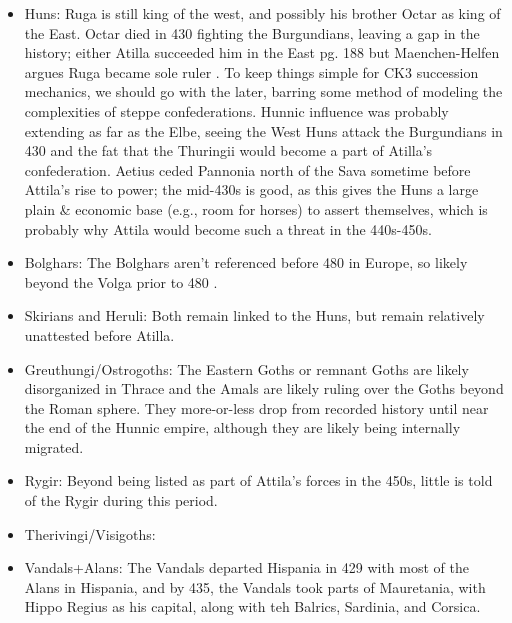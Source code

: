 \documentclass{article}
\begin{document}
	\begin{itemize}
		\item Huns:\newline
		Ruga is still king of the west, and possibly his brother Octar as king of the East.
		Octar died in 430 fighting the Burgundians, leaving a gap in the history; either Atilla succeeded him in the East \cite{CambridgeHistoryEarlyInnerAsia} \tiny pg. 188 \normalsize but Maenchen-Helfen argues Ruga became sole ruler \cite{OttoHuns}.
		To keep things simple for CK3 succession mechanics, we should go with the later, barring some method of modeling the complexities of steppe confederations.
		Hunnic influence was probably extending as far as the Elbe, seeing the West Huns attack the Burgundians in 430 and the fat that the Thuringii would become a part of Atilla's confederation.
		Aetius ceded Pannonia north of the Sava sometime before Attila's rise to power; the mid-430s is good, as this gives the Huns a large plain \& economic base (e.g., room for horses) to assert themselves, which is probably why Attila would become such a threat in the 440s-450s.
		
		\item Bolghars:\newline
		The Bolghars aren't referenced before 480 in Europe, so likely beyond the Volga prior to 480 \cite{KimHuns}.
		
		\item Skirians and Heruli:\newline
		Both remain linked to the Huns, but remain relatively unattested before Atilla.
		
		\item Greuthungi/Ostrogoths:\newline
		The Eastern Goths or remnant Goths are likely disorganized in Thrace and the Amals are likely ruling over the Goths beyond the Roman sphere.
		They more-or-less drop from recorded history until near the end of the Hunnic empire, although they are likely being internally migrated.
		
		\item Rygir:\newline
		Beyond being listed as part of Attila's forces in the 450s, little is told of the Rygir during this period.
		
		\item Therivingi/Visigoths:\newline
		
		
		\item Vandals+Alans:\newline
		The Vandals departed Hispania in 429 with most of the Alans in Hispania, and by 435, the Vandals took parts of Mauretania, with Hippo Regius as his capital, along with teh Balrics, Sardinia, and Corsica. 
		

\end{itemize}
\end{document}
